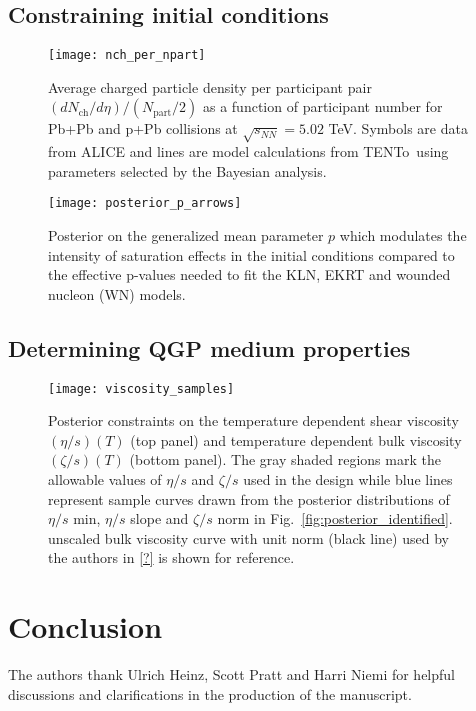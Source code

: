 \documentclass[aps,prc,reprint,amsmath]{revtex4-1}
\newcommand{\trento}{T\raisebox{-0.5ex}{R}ENTo}
\newcommand{\nch}{N_\text{ch}}
\newcommand{\npart}{N_\text{part}}
\newcommand{\sqrts}{\sqrt{s_{NN}}}
\begin{document}
\subsection{Constraining initial conditions}
\begin{figure}
    \texttt{[image: nch\_per\_npart]}
    \caption{Average charged particle density per participant pair $(d\nch/d\eta)/(\npart/2)$ as a function of participant number for Pb+Pb and p+Pb collisions at $\sqrts=5.02$ TeV.
    Symbols are data from ALICE and lines are model calculations from \protect\trento\ using parameters selected by the Bayesian analysis.}
\end{figure}

\begin{figure}
    \centering
    \texttt{[image: posterior\_p\_arrows]}
    \caption{Posterior on the generalized mean parameter $p$ which modulates the intensity of saturation effects in the initial conditions compared to the effective p-values needed to fit
    the KLN, EKRT and wounded nucleon (WN) models.}
    \label{posterior_p_arrows}
\end{figure}

\subsection{Determining QGP medium properties}
\begin{figure}
    \texttt{[image: viscosity\_samples]}
    \caption{Posterior constraints on the temperature dependent shear viscosity $(\eta/s)(T)$ (top panel) and temperature dependent bulk viscosity $(\zeta/s)(T)$ (bottom panel). The gray shaded regions mark the allowable values of $\eta/s$ and $\zeta/s$ used in the design while blue lines represent sample curves drawn from the posterior distributions of $\eta/s$ min, $\eta/s$ slope and $\zeta/s$ norm in Fig.~\ref{fig:posterior_identified}. unscaled bulk viscosity curve with unit norm (black line) used by the authors in \ref{?} is shown for reference.}
\end{figure}

\section{Conclusion}

\acknowledgements
The authors thank Ulrich Heinz, Scott Pratt and Harri Niemi for helpful discussions and clarifications in the production of the manuscript.
\appendix
\end{document}
